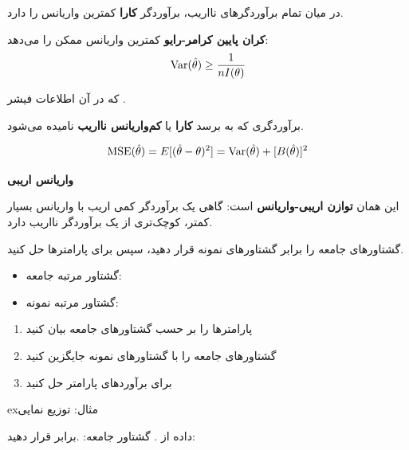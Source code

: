 در میان تمام برآوردگرهای نااریب، برآوردگر \textbf{کارا} کمترین واریانس را دارد.

\textbf{کران پایین کرامر-رایو}  کمترین واریانس ممکن را می‌دهد:\PSbr{}\[\text{Var}(\hat{\theta}) \geq \frac{1}{nI(\theta)}\]

که در آن  اطلاعات فیشر .

برآوردگری که به  برسد \textbf{کارا} یا \textbf{کم‌واریانس نااریب } نامیده می‌شود.


\[\text{MSE}(\hat{\theta}) = E[(\hat{\theta} - \theta)^2] = \text{Var}(\hat{\theta}) + [B(\hat{\theta})]^2\]

\textbf{ واریانس \lr{+} اریبی}

این همان \textbf{توازن اریبی-واریانس} است: گاهی یک برآوردگر کمی اریب با واریانس بسیار کمتر،  کوچک‌تری از یک برآوردگر نااریب دارد.



گشتاورهای جامعه را برابر گشتاورهای نمونه قرار دهید، سپس برای پارامترها حل کنید.

\begin{itemize}
\tightlist
\item
  گشتاور مرتبه  جامعه: 
\item
  گشتاور مرتبه  نمونه: 
\end{itemize}


\begin{enumerate}
\def\labelenumi{\arabic{enumi}.}
\tightlist
\item
  پارامترها را بر حسب گشتاورهای جامعه بیان کنید
\item
  گشتاورهای جامعه را با گشتاورهای نمونه جایگزین کنید
\item
  برای برآوردهای پارامتر حل کنید
\end{enumerate}

\begin{PSbox}[unbreakable]{ex}{مثال: توزیع نمایی}

داده از . گشتاور جامعه: .\PSbr{}برابر قرار دهید: 

\end{PSbox}

